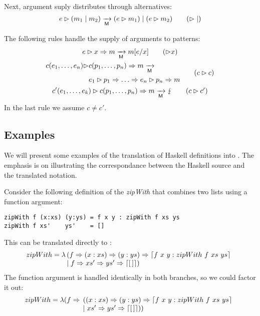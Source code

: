 Next, argument suply distributes through alternatives:
\begin{equation}
  \matcharg{e}{(\matchalt{m_1}{m_2})} \matred
  \matchalt{(\matcharg{e}{m_1})}{(\matcharg{e}{m_2})} \tag{$\amatcharg\amatchalt$}
\end{equation}

The following rules handle the supply of arguments to patterns:
\begin{gather}
  \matcharg{e}{\matchpat{x}{m}} \matred m[e/x] \tag{$\amatcharg x$}\\
  \begin{split}
      \matcharg{\constr{c}{e_1,\ldots,e_n}}{&\matchpat{\constr{c}{p_1,\ldots,p_n}}{m}}
      \matred \\
      &e_1 \amatcharg p_1 \amatchpat \ldots \amatchpat e_n \amatcharg p_n \amatchpat m
    \end{split} \tag{$c\amatcharg c$}
  \\
  \matcharg{\constr{c'}{e_1,\ldots,e_k}}{\matchpat{\constr{c}{p_1,\ldots,p_n}}{m}}
  \matred
  \matchfail \tag{$c\amatcharg c'$} 
\end{gather}
In the last rule we assume $c\neq c'$.


\subsection{Examples}\label{sec:examples}

We will present some examples of the translation of Haskell definitions
into \lambdaPMC.  The emphasis is on illustrating the correspondance
between the Haskell source and the translated notation.

Consider the following definition of the
\emph{zipWith} that combines two lists using a function argument:
%
\begin{verbatim}
zipWith f (x:xs) (y:ys) = f x y : zipWith f xs ys
zipWith f xs'    ys'    = []
\end{verbatim}
%
This can be translated directly to \lambdaPMC:
%
\[
  zipWith = \lambda 
  \!\!\begin{array}[t]{l}
    (f \Rightarrow (x:xs) \Rightarrow (y:ys) \Rightarrow \left\lceil f~x~y : zipWith~ f~ xs~ ys\right\rceil  \\
    \mid f \Rightarrow xs' \Rightarrow ys' \Rightarrow \left\lceil [\,]\right\rceil)
  \end{array}
\]
%
The function argument is handled identically in both branches, so we
could factor it out:
 \[
   zipWith = \lambda (f \Rightarrow 
   \!\!\begin{array}[t]{l}
     ((x:xs) \Rightarrow (y:ys) \Rightarrow \left\lceil f~ x~ y : zipWith~f~xs~ys\right\rceil  \\
     \mid  xs' \Rightarrow ys' \Rightarrow \left\lceil [\,]\right\rceil))
   \end{array}
 \]


